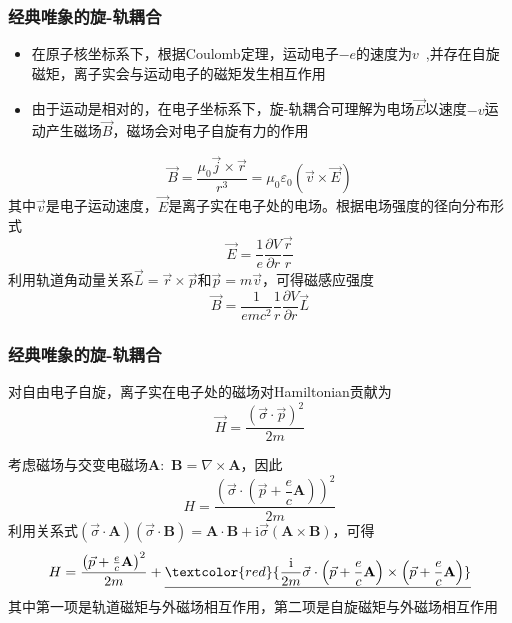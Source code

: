 \frame
{
	\frametitle{经典唯象的旋-轨耦合}
	\begin{itemize}
		\item 在原子核坐标系下，根据\textrm{Coulomb}定理，运动电子$-e$的速度为$v$~,并存在自旋磁矩，离子实会与运动电子的磁矩发生相互作用
		\item 由于运动是相对的，在电子坐标系下，旋-轨耦合可理解为电场$\vec E$以速度$-v$运动产生磁场$\vec B$，磁场会对电子自旋有力的作用
	\end{itemize}
	\begin{displaymath}
		\vec B=\frac{\mu_0\vec j\times\vec r}{r^3}=\mu_0\varepsilon_0(\vec v\times\vec E)
	\end{displaymath}
其中$\vec v$是电子运动速度，$\vec E$是离子实在电子处的电场。根据电场强度的径向分布形式
\begin{displaymath}
	\vec E=\frac1{e}\frac{\partial V}{\partial r}\frac{\vec r}r
\end{displaymath}
利用轨道角动量关系$\vec L=\vec r\times\vec p$和$\vec p=m\vec v$，可得磁感应强度
\begin{displaymath}
	\vec B=\frac1{emc^2}\frac1r\frac{\partial V}{\partial r}\vec L
\end{displaymath}
}

\frame
{
	\frametitle{经典唯象的旋-轨耦合}
对自由电子自旋，离子实在电子处的磁场对\textrm{Hamiltonian}贡献为
\begin{displaymath}
	\vec H=\frac{(\vec{\sigma}\cdot\vec p)^2}{2m}
\end{displaymath}

考虑磁场与交变电磁场$\mathbf{A}$:~$\mathbf B=\nabla\times\mathbf A$，因此
\begin{displaymath}
	H=\frac{\left( \vec{\sigma}\cdot\left( \vec p+\dfrac ec\mathbf A \right) \right)^2}{2m}
\end{displaymath}
利用关系式$(\vec{\sigma}\cdot\mathbf A)(\vec{\sigma}\cdot\mathbf B)=\mathbf{A}\cdot\mathbf{B}+\mathrm{i}\vec{\sigma}(\mathbf{A}\times\mathbf{B})$，可得
\begin{displaymath}
	H=\frac{\left( \vec p+\frac ec\mathbf{A} \right)^2}{2m}+\underline{\textcolor{red}{\frac{\mathrm i}{2m}\vec{\sigma}\cdot\left( \vec p+\frac ec\mathbf{A} \right)\times\left( \vec p+\frac ec\mathbf{A} \right)}}
\end{displaymath}
其中第一项是轨道磁矩与外磁场相互作用，第二项是自旋磁矩与外磁场相互作用
}

